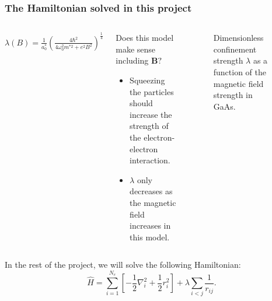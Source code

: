 \documentclass[xcolor=pdftex,hyperref={pdfpagelabels=false},table]{beamer}
\begin{document}
\begin{frame}
\frametitle{The Hamiltonian solved in this project}
\begin{footnotesize}

\begin{columns}[T,l]
\column{6cm}
$\lambda(B)=\frac{1}{a_0^*} \left( \frac{4 \hbar^2}{4 \omega_0^2 m^{*2}+e^2 B^2} \right)^{\frac{1}{4}}$

\begin{alertblock}{Does this model make sense including $\mathbf{B}?$}%
\begin{itemize}
\item
	Squeezing the particles should increase the strength of the electron-electron interaction.
\item
	$\lambda$ only decreases as the magnetic field increases in this model.
\end{itemize}
\end{alertblock}
\column{5cm}
\begin{figure}
	\begin{center}
		\scalebox{0.7}{}
	\end{center}
	\caption{Dimensionless confinement strength $\lambda$ as a function of the magnetic field strength in GaAs.}
\end{figure}
\end{columns}
In the rest of the project, we will solve the following Hamiltonian:
\begin{equation}
  \hat{H}=\sum_{i=1}^{N_e} \left[  -\frac{1}{2} \nabla_i^2 + \frac{1}{2} r_i^2  \right]+ \lambda \sum_{i<j}\frac{1}{r_{ij}}.
\end{equation}

\end{footnotesize}
\end{frame}
\end{document}

